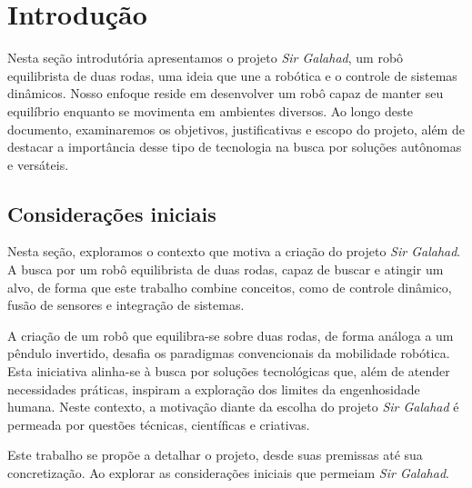 
\chapter{Introdução}\label{cap:introducao}

Nesta seção introdutória apresentamos o projeto \textit{Sir Galahad}, um robô equilibrista de duas rodas, uma ideia que une a robótica e o controle de sistemas dinâmicos. Nosso enfoque reside em desenvolver um robô capaz de manter seu equilíbrio enquanto se movimenta em ambientes diversos. Ao longo deste documento, examinaremos os objetivos, justificativas e escopo do projeto, além de destacar a importância desse tipo de tecnologia na busca por soluções autônomas e versáteis.

\section{\textbf{Considerações iniciais}}

Nesta seção, exploramos o contexto que motiva a criação do projeto \textit{Sir Galahad}. A busca por um robô equilibrista de duas rodas, capaz de buscar e atingir um alvo, de forma que este trabalho combine conceitos, como de controle dinâmico, fusão de sensores e integração de sistemas. 

A criação de um robô que equilibra-se sobre duas rodas, de forma análoga a um pêndulo invertido, desafia os paradigmas convencionais da mobilidade robótica. Esta iniciativa alinha-se à busca por soluções tecnológicas que, além de atender necessidades práticas, inspiram a exploração dos limites da engenhosidade humana. Neste contexto, a motivação diante da escolha do projeto  \textit{Sir Galahad} é permeada por questões técnicas, científicas e criativas. 

Este trabalho se propõe a detalhar o projeto, desde suas premissas até sua concretização. Ao explorar as considerações iniciais que permeiam \textit{Sir Galahad}. 

